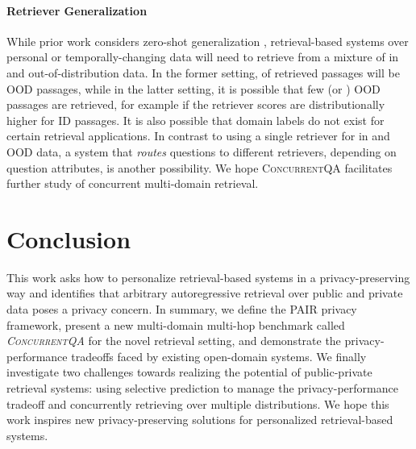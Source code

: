 \documentclass{article}
\renewcommand\cite{\citep}	\newcommand\shortcite{\citeyearpar}\newcommand\newcite{\citet}
\newcommand{\datasetname}{\textsc{ConcurrentQA}\xspace}
\newcommand{\problemshortname}{\textsc{PAIR}\xspace}
\begin{document}
\paragraph{Retriever Generalization} While prior work considers zero-shot generalization \cite{thakur2021beir, guoa2021multireqa}, retrieval-based systems over personal or temporally-changing data will need to retrieve from a mixture of in and out-of-distribution  data. In the former setting,  of  retrieved passages will be OOD passages, while in the latter setting, it is possible that few (or ) OOD passages are retrieved, for example if the retriever scores are distributionally higher for ID passages. It is also possible that domain labels do not exist for certain retrieval applications. In contrast to using a single retriever for in and OOD data, a system that \textit{routes} questions to different retrievers, depending on question attributes, is another possibility. We hope \datasetname facilitates further study of concurrent multi-domain retrieval. 

 
\section{Conclusion}
This work asks how to personalize retrieval-based systems in a privacy-preserving way and identifies that arbitrary autoregressive retrieval over public and private data poses a privacy concern. In summary, we define the \problemshortname privacy framework, present a new multi-domain multi-hop benchmark called \textit{\datasetname} for the novel retrieval setting, and demonstrate the privacy-performance tradeoffs faced by existing open-domain systems. We finally investigate two challenges towards realizing the potential of public-private retrieval systems: using selective prediction to manage the privacy-performance tradeoff and concurrently retrieving over multiple distributions. We hope this work inspires new privacy-preserving solutions for personalized retrieval-based systems. 
\end{document}

